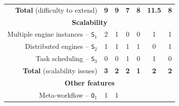 \documentclass[preprint,3p,twocolumn]{elsarticle}
\begin{document}
\begin{table}
\begin{tabular}{rcccccc}
  \textbf{Total} (difficulty to extend) & \cellcolor[HTML]{99E099}\textbf{9}
                                     & \cellcolor[HTML]{99E099}\textbf{9}
                                     & \cellcolor[HTML]{99FF99}\textbf{7}
                                     & \cellcolor[HTML]{99EF99}\textbf{8}
                                     & \cellcolor[HTML]{99BB99}\textbf{11.5}
                                     & \cellcolor[HTML]{99EF99}\textbf{8}\\
\multicolumn{7}{c}{\cellcolor[HTML]{EEEEEE}\textbf{Scalability}}\\
Multiple engine instances -- \texttt{S$_1$}& \cellcolor[HTML]{99BB99}2
                                     & \cellcolor[HTML]{99DD99}1
                                     & \cellcolor[HTML]{99FF99}0
                                     & \cellcolor[HTML]{99FF99}0
                                     & \cellcolor[HTML]{99DD99}1
                                     & \cellcolor[HTML]{99DD99}1\\
Distributed engines -- \texttt{S$_2$}& \cellcolor[HTML]{99BB99}1
                                     & \cellcolor[HTML]{99BB99}1
                                     & \cellcolor[HTML]{99BB99}1
                                     & \cellcolor[HTML]{99BB99}1
                                     & \cellcolor[HTML]{99FF99}0
                                     & \cellcolor[HTML]{99BB99}1\\
Task scheduling -- \texttt{S$_3$}    & \cellcolor[HTML]{99FF99}0
                                     & \cellcolor[HTML]{99FF99}0
                                     & \cellcolor[HTML]{99BB99}1
                                     & \cellcolor[HTML]{99FF99}0
                                     & \cellcolor[HTML]{99BB99}1
                                     & \cellcolor[HTML]{99FF99}0\\
\textbf{Total} (scalability issues)  & \cellcolor[HTML]{99BB99}\textbf{3}
                                     & \cellcolor[HTML]{99DD99}\textbf{2}
                                     & \cellcolor[HTML]{99DD99}\textbf{2}
                                     & \cellcolor[HTML]{99FF99}\textbf{1}
                                     & \cellcolor[HTML]{99DD99}\textbf{2}
                                     & \cellcolor[HTML]{99DD99}\textbf{2}\\
\multicolumn{7}{c}{\cellcolor[HTML]{EEEEEE}\textbf{Other features}}\\
  Meta-workflow  -- \texttt{O$_1$}    & \cellcolor[HTML]{99BB99}1
                                     & \cellcolor[HTML]{99BB99}1

\end{tabular}
\end{table}
\end{document}
